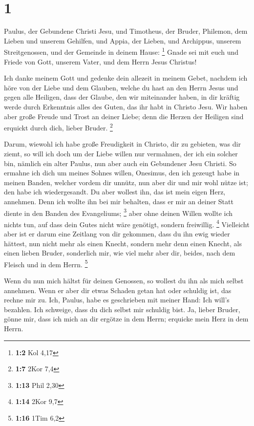 \hypertarget{section}{%
\section{1}\label{section}}

 Paulus, der Gebundene Christi Jesu, und Timotheus, der
Bruder, Philemon, dem Lieben und unserem Gehilfen,  und
Appia, der Lieben, und Archippus, unserem Streitgenossen, und der
Gemeinde in deinem Hause: \footnote{\textbf{1:2} Kol 4,17}
 Gnade sei mit euch und Friede von Gott, unserem Vater,
und dem Herrn Jesus Christus!

 Ich danke meinem Gott und gedenke dein allezeit in meinem
Gebet,  nachdem ich höre von der Liebe und dem Glauben,
welche du hast an den Herrn Jesus und gegen alle Heiligen,
 dass der Glaube, den wir miteinander haben, in dir
kräftig werde durch Erkenntnis alles des Guten, das ihr habt in Christo
Jesu.  Wir haben aber große Freude und Trost an deiner
Liebe; denn die Herzen der Heiligen sind erquickt durch dich, lieber
Bruder. \footnote{\textbf{1:7} 2Kor 7,4}

 Darum, wiewohl ich habe große Freudigkeit in Christo, dir
zu gebieten, was dir ziemt,  so will ich doch um der Liebe
willen nur vermahnen, der ich ein solcher bin, nämlich ein alter Paulus,
nun aber auch ein Gebundener Jesu Christi.  So ermahne
ich dich um meines Sohnes willen, Onesimus, den ich gezeugt habe in
meinen Banden,  welcher vordem dir unnütz, nun aber dir
und mir wohl nütze ist; den habe ich wiedergesandt.  Du
aber wollest ihn, das ist mein eigen Herz, annehmen. 
Denn ich wollte ihn bei mir behalten, dass er mir an deiner Statt diente
in den Banden des Evangeliums; \footnote{\textbf{1:13} Phil 2,30}
 aber ohne deinen Willen wollte ich nichts tun, auf dass
dein Gutes nicht wäre genötigt, sondern freiwillig. \footnote{\textbf{1:14}
  2Kor 9,7}  Vielleicht aber ist er darum eine Zeitlang
von dir gekommen, dass du ihn ewig wieder hättest,  nun
nicht mehr als einen Knecht, sondern mehr denn einen Knecht, als einen
lieben Bruder, sonderlich mir, wie viel mehr aber dir, beides, nach dem
Fleisch und in dem Herrn. \footnote{\textbf{1:16} 1Tim 6,2}

 Wenn du nun mich hältst für deinen Genossen, so wollest
du ihn als mich selbst annehmen.  Wenn er aber dir etwas
Schaden getan hat oder schuldig ist, das rechne mir zu. 
Ich, Paulus, habe es geschrieben mit meiner Hand: Ich will's bezahlen.
Ich schweige, dass du dich selbst mir schuldig bist.  Ja,
lieber Bruder, gönne mir, dass ich mich an dir ergötze in dem Herrn;
erquicke mein Herz in dem Herrn.

